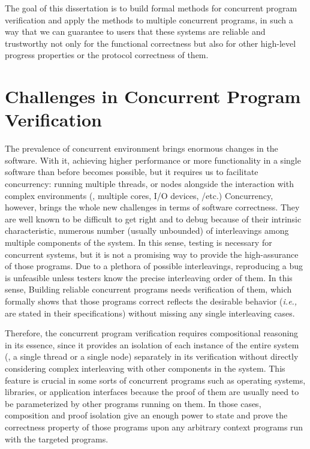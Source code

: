 The goal of this dissertation is to build formal methods for concurrent program verification and apply the methods to multiple concurrent programs,
in such a way that we can guarantee to users that these systems are reliable and trustworthy not only for the functional correctness but also for other high-level progress properties or the protocol correctness of them. 

\section{Challenges in Concurrent Program Verification}
\label{chapter:introduction:sec:challenges-in-concurrent-program-verification}


The prevalence of concurrent environment brings enormous changes in the software. 
With it, achieving higher performance or more functionality in a single software than before 
becomes possible, 
but it requires us to facilitate 
concurrency: running multiple threads, or nodes alongside the interaction with complex environments (\ie, multiple cores, I/O devices, /etc.)
Concurrency, however, 
brings the whole new challenges in terms of software correctness. 
They are well known to be difficult to get right and to debug because of their intrinsic characteristic, numerous number (usually unbounded) of interleavings among multiple components of the system. 
In this sense, testing is necessary for concurrent systems,
but it is not a promising way to provide the high-assurance of those programs. 
Due to a plethora of possible interleavings, 
reproducing a bug is unfeasible unless testers know the precise interleaving order of them. 
In this sense, 
Building reliable concurrent programs 
needs verification of them, which formally shows that those programs correct reflects the 
desirable behavior (\textit{i.e.,} are stated in their specifications) 
without missing any single interleaving cases. 


Therefore, the concurrent program verification requires compositional reasoning in its essence, since it provides an isolation of each instance of the entire system
(\ie, a single thread or a single node) separately in its verification
without directly considering complex interleaving 
with other components in the system. 
This feature is crucial in some sorts 
of concurrent programs such as 
operating systems, libraries, or application interfaces because the
proof of them  are usually need to be parameterized by 
other programs running on them. 
In those cases, composition and proof isolation 
give  an enough power to state and prove the correctness property 
of those programs upon any arbitrary context programs run with the targeted programs. 


